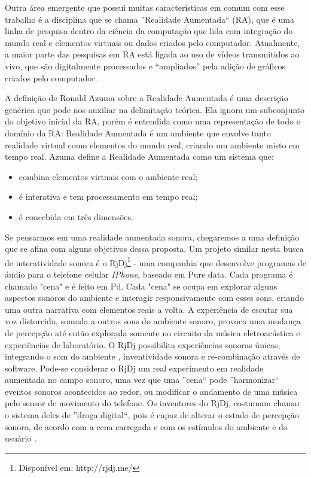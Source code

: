\documentclass{ppgmus}
\begin{document}
Outra área emergente que possui muitas características em comum com esse 
trabalho é a disciplina que se chama ''Realidade Aumentada`` (RA), que é uma linha de pesquisa dentro da ciência da computação que lida com 
integração do mundo real e elementos virtuais ou dados criados pelo computador. Atualmente, a 
maior parte das pesquisas em RA está ligada ao uso de vídeos transmitidos ao vivo, que são 
digitalmente processados e “ampliados” pela adição de gráficos criados pelo computador.

A definição de Ronald Azuma 
sobre a Realidade Aumentada \cite{azuma97:ar} é uma descrição genérica que pode nos auxiliar na delimitação teórica. 
Ela ignora um subconjunto do objetivo inicial da RA, porém é entendida como uma representação 
de todo o domínio da RA: Realidade Aumentada é um ambiente que envolve tanto realidade virtual 
como elementos do mundo real, criando um ambiente misto em tempo real.
Azuma define a Realidade Aumentada como um sistema que:
\begin{itemize}
 \item combina elementos virtuais com o ambiente real; 
  \item é interativa e tem processamento em tempo real; 
  \item  é concebida em três dimensões.
\end{itemize}

    
Se pensarmos em uma realidade aumentada sonora, chegaremos a uma definição que se afina 
com alguns objetivos dessa proposta.
Um projeto similar nesta busca de interatividade sonora é o RjDj\footnote{Disponível em: http://rjdj.me/}
 - uma companhia que desenvolve 
programas de áudio para o telefone celular \textit{IPhone}, baseado em Pure data. Cada programa 
é chamado "cena" e é feito em Pd. Cada "cena" se ocupa em explorar alguns 
aspectos sonoros do ambiente e interagir responsivamente com esses sons, criando uma 
outra narrativa com elementos reais a volta. A experiência de escutar sua voz distorcida,
somada a outros sons do ambiente sonoro, provoca uma mudança de percepção até então 
explorada somente no circuito da música eletroacústica e experiências de laboratório. 
O RjDj possibilita experiências sonoras únicas, integrando o som do ambiente , 
inventividade sonora e re-combinação através de software. Pode-se considerar o 
RjDj um real experimento em realidade aumentada no campo sonoro, uma vez que uma ''cena``
pode ''harmonizar`` eventos sonoros acontecidos ao redor, ou modificar o andamento de
uma música pelo sensor de movimento do telefone. Os inventores do RjDj, costumam chamar 
o sistema deles de ''droga digital``, pois é capaz de alterar o estado de percepção sonora,
de acordo com a cena carregada e com os estímulos do ambiente e do usuário \cite{rj}. 
\end{document}
